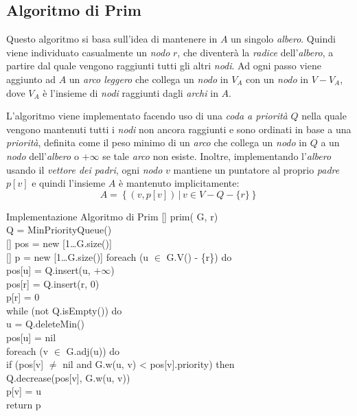 \subsection{Algoritmo di Prim}
Questo algoritmo si basa sull'idea di mantenere in $A$ un singolo \emph{albero}.
Quindi viene individuato casualmente un \emph{nodo} $r$, che diventerà la
\emph{radice} dell'\emph{albero}, a partire dal quale vengono raggiunti tutti
gli altri \emph{nodi}. Ad ogni passo viene aggiunto ad $A$ un \emph{arco
leggero} che collega un \emph{nodo} in $V_A$ con un \emph{nodo} in $V-V_A$,
dove $V_A$ è l'insieme di \emph{nodi} raggiunti dagli \emph{archi} in $A$.

L'algoritmo viene implementato facendo uso di una \emph{coda a priorità} $Q$
nella quale vengono mantenuti tutti i \emph{nodi} non ancora raggiunti e sono
ordinati in base a una \emph{priorità}, definita come il peso minimo di un
\emph{arco} che collega un \emph{nodo} in $Q$ a un \emph{nodo} dell'\emph{albero} o
$+\infty$ se tale \emph{arco} non esiste. Inoltre, implementando l'\emph{albero}
usando il \emph{vettore dei padri}, ogni \emph{nodo} $v$ mantiene un puntatore
al proprio \emph{padre} $p[v]$ e quindi l'insieme $A$ è mantenuto implicitamente:
\[A=\left\{(v,p[v])\,|\,v\in V-Q-\{r\}\right\}\]

\begin{minicode}{Implementazione Algoritmo di Prim}
\ind{}[] prim( G,  r)\\
     Q = MinPriorityQueue()\\
    [] pos = new [1\dots G.size()]\\
    [] p = new [1\dots G.size()]\hfill{}
    \indf foreach (u $\in$ G.V() - \{r\}) do\\
        pos[u] = Q.insert(u, $+\infty$)\\
    \indf pos[r] = Q.insert(r, 0)\\
    \indf p[r] = 0\\
    \indf while (not Q.isEmpty()) do\\
         u = Q.deleteMin()\\
        pos[u] = nil\\
        \indff foreach (v $\in$ G.adj(u)) do\\
            \indfff if (pos[v] $\neq$ nil and G.w(u, v) < pos[v].priority) then\\
                Q.decrease(pos[v], G.w(u, v))\\
                p[v] = u\\
    \indf return p
\end{minicode}

